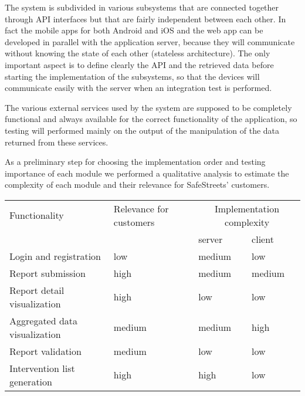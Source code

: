 The system is subdivided in various subsystems that are connected together through API interfaces but that are fairly independent between each other. In fact the mobile apps for both Android and iOS and the web app can be developed in parallel with the application server, because they will communicate without knowing the state of each other (stateless architecture). The only important aspect is to define clearly the API and the retrieved data before starting the implementation of the subsystems, so that the devices will communicate easily with the server when an integration test is performed.

The various external services used by the system are supposed to be completely functional and always available for the correct functionality of the application, so testing will performed mainly on the output of the manipulation of the data returned from these services.

As a preliminary step for choosing the implementation order and testing importance of each module we performed a qualitative analysis to estimate the complexity of each module and their relevance for SafeStreets' customers.

\bigskip
\begin{tabular}{|p{5cm}|p{4.5cm}|p{2.2cm}|p{2cm}|}
	\hline 
	Functionality & Relevance for customers & \multicolumn{2}{c|}{Implementation complexity} \\ 
	& & server & client \\
	\hline
	\hline 
	Login and registration & low & medium & low \\ 
	\hline 
	Report submission & high & medium & medium \\ 
	\hline 
	Report detail visualization & high & low & low \\ 
	\hline 
	Aggregated data visualization & medium & medium & high \\ 
	\hline 
	Report validation & medium & low & low \\ 
	\hline 
	Intervention list generation & high & high & low \\  
	\hline 
\end{tabular} 
